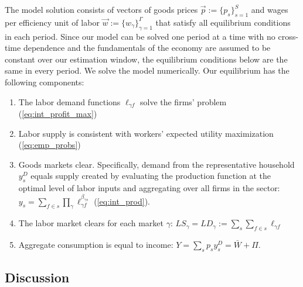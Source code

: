 \documentclass[12pt]{article}
\def\g{\gamma}
\theoremstyle{definition}
\theoremstyle{plain}
\begin{document}
The model solution consists of vectors of goods prices $\vec{p} := \{p_{s}\}_{s=1}^S$ and wages per efficiency unit of labor $\vec{w} := \{w_{\g}\}_{\g=1}^\Gamma$ that satisfy all equilibrium conditions in each period. Since our model can be solved one period at a time with no cross-time dependence and the fundamentals of the economy are assumed to be constant over our estimation window, the equilibrium conditions below are the same in every period. We solve the model numerically. Our equilibrium has the following components:
\begin{enumerate} 
	\item The labor demand functions $\ell_{\g f}$ solve the firms' problem (\ref{eq:int_profit_max})
	\item Labor supply is consistent with workers' expected utility maximization (\ref{eq:emp_probs})
	\item Goods markets clear. Specifically, demand from the representative household $y_s^D$ equals supply created by evaluating the production function at the optimal level of labor inputs and aggregating over all firms in the sector: $y_s = \sum_{f \in s} \prod_{\g} \ell_{\g f}^{\beta_{\g s}} $ (\ref{eq:int_prod}).
	\item The labor market clears for each market $\g$: $LS_\g = LD_\g := \sum_s \sum_{f \in s} \ell_{\g f}$
	\item Aggregate consumption is equal to income: $Y = \sum_{s} p_s y_s^D = \bar W + \Pi$.
\end{enumerate}


\subsection{Discussion}
\end{document}
